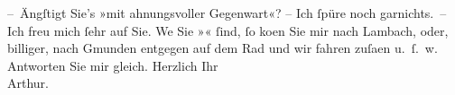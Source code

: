 \begin{ledgroupsized}[t]{13cm}
           \pstart
           – Ängſtigt Sie’s »mit ahnungsvoller
                  Gegenwart«? – Ich ſpüre noch garnichts. –\pend
           \pstart
           Ich freu mich ſehr auf Sie. We{\geminationn}{ }{\pb}Sie »\textsc{}« ſind, ſo ko{\geminationm}en Sie mir nach Lambach, oder, billiger, nach Gmunden entgegen auf dem Rad und wir fahren zuſa{\geminationm}en u. ſ. w.\pend
           \pstart
           Antworten Sie mir gleich.\pend
           \pstart
           Herzlich Ihr{\\}\spacefill\mbox{Arthur.}\pend
           
         
         \endnumbering{}\end{ledgroupsized}  \newcommand{\dateiname}{L00685}\newcommand{\titel}{Arthur Schnitzler an Richard Beer-Hofmann, 12. 6. 1897}\newcommand{\editorInnen}{Martin Anton Müller und Gerd-Hermann Susen}
      